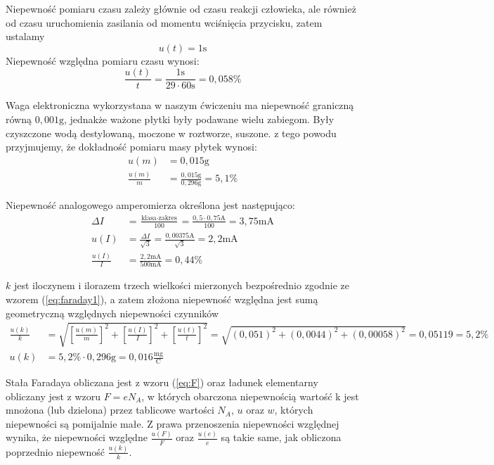 \documentclass{fizykalab}
\newcommand{\s}{\ensuremath{\text{s}}}
\newcommand{\g}{\ensuremath{\text{g}}}
\newcommand{\ampr}{\ensuremath{\text{A}}}
\newcommand{\mampr}{\ensuremath{\text{mA}}}
\newcommand{\mgC}{\ensuremath{\frac{\text{mg}}{\text{C}}}}
\begin{document}
Niepewność pomiaru czasu zależy głównie od czasu reakcji
człowieka, ale również od czasu uruchomienia zasilania od
momentu wciśnięcia przycisku, zatem ustalamy 
\begin{equation*}
    u(t) = 1 \text{s}
\end{equation*}
Niepewność względna pomiaru czasu wynosi:
\begin{equation*}
    \frac{u(t)}{t} = \frac{1\s}{29 \cdot 60 \s} = 0,058 \%
\end{equation*}

Waga elektroniczna wykorzystana w naszym ćwiczeniu ma 
niepewność graniczną równą $0,001 \g$, jednakże
ważone płytki były podawane wielu zabiegom.
Były czyszczone wodą destylowaną, 
moczone w roztworze, suszone.
z tego powodu
przyjmujemy, że dokładność pomiaru masy płytek wynosi:
\begin{align*}
    u(m) &= 0,015 \g \\
    \frac{u(m)}{m} &= \frac{0,015 \g}{0,296 \g}  = 5,1 \%
\end{align*}

Niepewność analogowego amperomierza określona jest następująco:
\begin{align*}
    \Delta I &= \frac{\text{klasa} \cdot \text{zakres}}{100} 
    = \frac{0,5 \cdot 0,75 \ampr}{100} = 3,75 \mampr \\
    u(I) &= \frac{\Delta I}{\sqrt{3}} = 
    \frac{0,00375 \ampr}{\sqrt{3}} = 2,2 \mampr \\
    \frac{u(I)}{I} &= \frac{2,2\mampr}{500 \mampr} = 0,44 \%
\end{align*}

$k$ jest iloczynem i ilorazem trzech
wielkości mierzonych bezpośrednio zgodnie ze 
wzorem (\ref{eq:faraday1}), a zatem
złożona niepewność względna jest sumą geometryczną względnych niepewności czynników 
\begin{align*}
    \frac{u(k)}{k} &= \sqrt{
        \left[ \frac{u(m)}{m} \right]^2 + 
        \left[ \frac{u(I)}{I} \right]^2 + 
        \left[ \frac{u(t)}{t} \right]^2 
    } =  \sqrt{
        \left( 0,051 \right)^2 + 
        \left( 0,0044  \right)^2 + 
        \left( 0,00058  \right)^2 
    }  = 0,05119 = 5,2 \% \\
    u(k) &= 5,2 \% \cdot 0,296 \g = 0,016 \mgC
\end{align*}

Stała Faradaya obliczana jest z wzoru (\ref{eq:F}) oraz ładunek elementarny obliczany jest z wzoru $F = e N_A$, w których obarczona
niepewnością wartość k jest mnożona (lub dzielona) przez tablicowe wartości $N_A$, $u$ oraz $w$, których
niepewności są pomijalnie małe. Z prawa przenoszenia niepewności względnej wynika, że
niepewności względne $\frac{u(F)}{F}$ oraz $\frac{u(e)}{e}$ są takie same, jak obliczona poprzednio niepewność $\frac{u(k)}{k}$.
\end{document}
